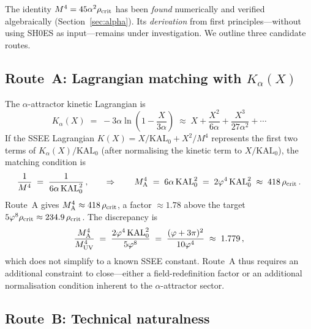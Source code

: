 \documentclass[12pt,a4paper]{article}
\newcommand{\phiG}{\varphi}
\newcommand{\KAL}{\mathrm{KAL}_0}
\newcommand{\rhoc}{\rho_{\rm crit}}
\begin{document}
The identity $M^4 = 45\alpha^2\rhoc$ has been \emph{found} numerically and
verified algebraically (Section~\ref{sec:alpha}).
Its \emph{derivation} from first principles---without using SH0ES as
input---remains under investigation.
We outline three candidate routes.

\subsection{Route~A: Lagrangian matching with $K_\alpha(X)$}

The $\alpha$-attractor kinetic Lagrangian is
\begin{equation}
  K_\alpha(X) \;=\; -3\alpha\ln\!\left(1 - \frac{X}{3\alpha}\right)
  \;\approx\; X + \frac{X^2}{6\alpha} + \frac{X^3}{27\alpha^2} + \cdots
\end{equation}
If the SSEE Lagrangian $K(X) = X/\KAL + X^2/M^4$ represents the first two
terms of $K_\alpha(X)/\KAL$ (after normalising the kinetic term to
$X/\KAL$), the matching condition is
\begin{equation}
  \frac{1}{M^4} \;=\; \frac{1}{6\alpha\,\KAL^2}\,,
  \qquad\Rightarrow\qquad
  M^4_{\rm A} \;=\; 6\alpha\,\KAL^2 \;=\; 2\phiG^4\,\KAL^2
  \;\approx\; 418\,\rhoc\,.
  \label{eq:MA}
\end{equation}
Route~A gives $M^4_{\rm A} \approx 418\,\rhoc$, a factor $\approx 1.78$ above
the target $5\phiG^8\rhoc \approx 234.9\,\rhoc$.
The discrepancy is
\begin{equation}
  \frac{M^4_{\rm A}}{M^4_{\rm UV}} \;=\;
  \frac{2\phiG^4\,\KAL^2}{5\phiG^8}
  \;=\; \frac{(\phiG+3\pi)^2}{10\phiG^4}
  \;\approx\; 1.779\,,
\end{equation}
which does not simplify to a known SSEE constant.
Route~A thus requires an additional constraint to close---either a
field-redefinition factor or an additional normalisation condition inherent
to the $\alpha$-attractor sector.

\subsection{Route~B: Technical naturalness}
\end{document}
